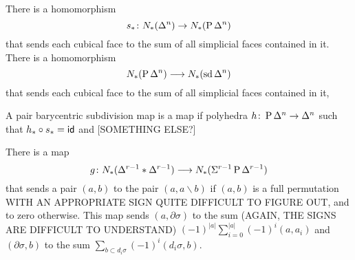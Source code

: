 There is a homomorphism 
\[s_*\colon N_*(\Delta^n)\to N_*(\operatorname{P} \Delta^n)\]
that sends each cubical face to the sum of all simplicial faces contained in it. There is a homomorphism
\[N_*(\operatorname{P} \Delta^n)\longrightarrow N_*(\operatorname{sd} \Delta^n)\]
that sends each cubical face to the sum of all simplicial faces contained in it,
\begin{definition}
    A pair barycentric subdivision map is a map if polyhedra $h\colon \operatorname{P} \Delta^n\to \Delta^n$ such that $h_*\circ s_* = \mathsf{id}$ and [SOMETHING ELSE?]
\end{definition}
There is a map
\[g\colon N_*(\Delta^{r-1}*\Delta^{r-1})\longrightarrow N_*(\Sigma^{r-1}\operatorname{P} \Delta^{r-1})\]
that sends a pair $(a,b)$ to the pair $(a,a\smallsetminus b)$ if $(a,b)$ is a full permutation WITH AN APPROPRIATE SIGN QUITE DIFFICULT TO FIGURE OUT, and to zero otherwise. This map sends $(a,\partial \sigma)$ to the sum (AGAIN, THE SIGNS ARE DIFFICULT TO UNDERSTAND) $(-1)^{|a|}\sum_{i=0}^{|a|}(-1)^i (a,a_i)$ and $(\partial \sigma, b)$ to the sum $\sum_{b\subset d_i\sigma}(-1)^i(d_i\sigma,b)$.

